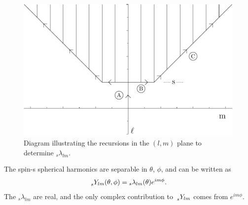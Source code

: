 \documentclass[prd,amsmath,amssymb,floatfix,nofootinbib,superscriptaddress, twocolumn]{revtex4}
\newcommand{\spin}[1]{\,{}_{#1}^{\vphantom{m}}}
\newcommand{\yslm}[3]{\spin{#1} Y_{#2 #3}}
\begin{document}
%
\begin{figure}[!ht]
\includegraphics[width=\columnwidth]{rec_graph.pdf}
\caption{Diagram illustrating the recursions in the $(l,m)$ plane to determine ${}_{s} \lambda_{l m}$.}
\label{fig:recursion_minimal}
\end{figure}
%
The spin-s spherical harmonics are separable in $\theta$, $\phi$, and can be written as
%
\begin{equation}
\yslm{s}{l}{m}(\theta,\phi) = {}_{s} \lambda_{lm} (\theta) e^{im\phi}.
\end{equation}
%
The ${}_s \lambda_{lm}$ are real, and the only complex contribution
to $\yslm{s}{l}{m}$ comes from $e^{im\phi}$.
\end{document}
